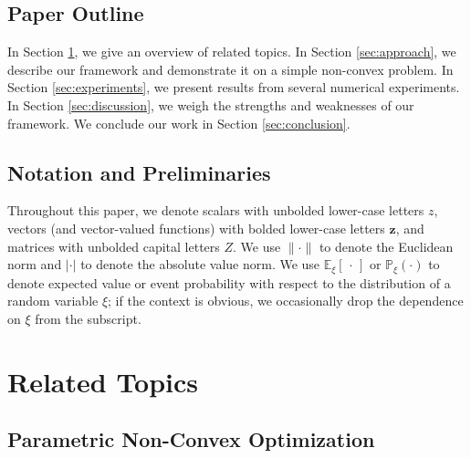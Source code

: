 \documentclass[10pt]{article} %
\theoremstyle{plain}
\theoremstyle{definition}
\theoremstyle{remark}
\begin{document}

\subsection{Paper Outline}

In Section \ref{sec:related-topics}, we give an overview of related topics. In Section \ref{sec:approach}, we describe our framework and demonstrate it on a simple non-convex problem. In Section \ref{sec:experiments}, we present results from several numerical experiments. In Section \ref{sec:discussion}, we weigh the strengths and weaknesses of our framework. We conclude our work in Section \ref{sec:conclusion}.

\subsection{Notation and Preliminaries}

Throughout this paper, we denote scalars with unbolded lower-case letters $z$, vectors (and vector-valued functions) with bolded lower-case letters $\mathbf{z}$, and matrices with unbolded capital letters $Z$. We use $\| \cdot \|$ to denote the Euclidean norm and $| \cdot |$ to denote the absolute value norm. We use $\mathbb{E}_\xi[\, \cdot \,]$ or $\mathbb{P}_\xi(\cdot)$ to denote expected value or event probability with respect to the distribution of a random variable $\xi$; if the context is obvious, we occasionally drop the dependence on $\xi$ from the subscript.

\section{Related Topics} \label{sec:related-topics}

\subsection*{Parametric Non-Convex Optimization}
\end{document}
